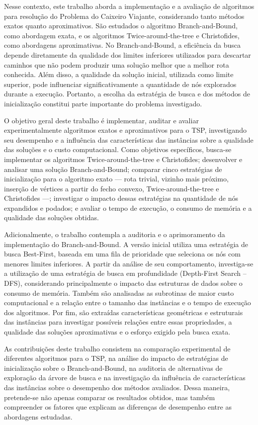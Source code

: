 \documentclass[12pt]{article}
\begin{document}
Nesse contexto, este trabalho aborda a implementação e a avaliação de algoritmos para resolução do Problema do Caixeiro Viajante, considerando tanto métodos exatos quanto aproximativos. São estudados o algoritmo Branch-and-Bound, como abordagem exata, e os algoritmos Twice-around-the-tree e Christofides, como abordagens aproximativas. No Branch-and-Bound, a eficiência da busca depende diretamente da qualidade dos limites inferiores utilizados para descartar caminhos que não podem produzir uma solução melhor que a melhor rota conhecida. Além disso, a qualidade da solução inicial, utilizada como limite superior, pode influenciar significativamente a quantidade de nós explorados durante a execução. Portanto, a escolha da estratégia de busca e dos métodos de inicialização constitui parte importante do problema investigado.

O objetivo geral deste trabalho é implementar, auditar e avaliar experimentalmente algoritmos exatos e aproximativos para o TSP, investigando seu desempenho e a influência das características das instâncias sobre a qualidade das soluções e o custo computacional. Como objetivos específicos, busca-se implementar os algoritmos Twice-around-the-tree e Christofides; desenvolver e analisar uma solução Branch-and-Bound; comparar cinco estratégias de inicialização para o algoritmo exato — rota trivial, vizinho mais próximo, inserção de vértices a partir do fecho convexo, Twice-around-the-tree e Christofides —; investigar o impacto dessas estratégias na quantidade de nós expandidos e podados; e avaliar o tempo de execução, o consumo de memória e a qualidade das soluções obtidas.

Adicionalmente, o trabalho contempla a auditoria e o aprimoramento da implementação do Branch-and-Bound. A versão inicial utiliza uma estratégia de busca Best-First, baseada em uma fila de prioridade que seleciona os nós com menores limites inferiores. A partir da análise de seu comportamento, investiga-se a utilização de uma estratégia de busca em profundidade (Depth-First Search – DFS), considerando principalmente o impacto das estruturas de dados sobre o consumo de memória. Também são analisadas as subrotinas de maior custo computacional e a relação entre o tamanho das instâncias e o tempo de execução dos algoritmos. Por fim, são extraídas características geométricas e estruturais das instâncias para investigar possíveis relações entre essas propriedades, a qualidade das soluções aproximativas e o esforço exigido pela busca exata.

As contribuições deste trabalho consistem na comparação experimental de diferentes algoritmos para o TSP, na análise do impacto de estratégias de inicialização sobre o Branch-and-Bound, na auditoria de alternativas de exploração da árvore de busca e na investigação da influência de características das instâncias sobre o desempenho dos métodos avaliados. Dessa maneira, pretende-se não apenas comparar os resultados obtidos, mas também compreender os fatores que explicam as diferenças de desempenho entre as abordagens estudadas.
\end{document}
